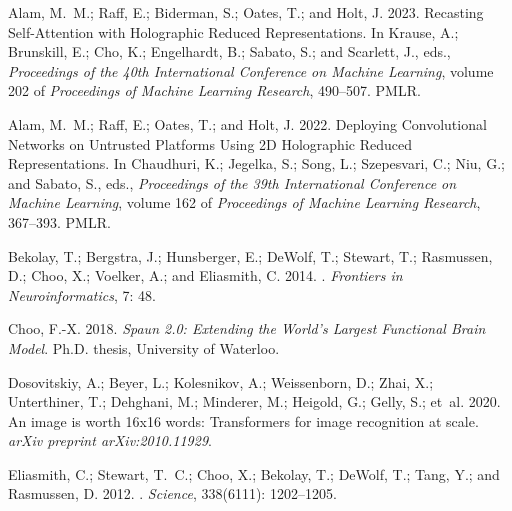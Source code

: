 \documentclass[letterpaper]{article} %
\begin{document}
\clearpage
\begin{thebibliography}{33}
    \providecommand{\natexlab}[1]{#1}

    Alam, M.~M.; Raff, E.; Biderman, S.; Oates, T.; and Holt, J. 2023.
    \newblock Recasting Self-Attention with Holographic Reduced Representations.
    \newblock In Krause, A.; Brunskill, E.; Cho, K.; Engelhardt, B.; Sabato, S.;
      and Scarlett, J., eds., \emph{Proceedings of the 40th International
      Conference on Machine Learning}, volume 202 of \emph{Proceedings of Machine
      Learning Research}, 490--507. PMLR.

    Alam, M.~M.; Raff, E.; Oates, T.; and Holt, J. 2022.
    \newblock Deploying Convolutional Networks on Untrusted Platforms Using 2{D}
      Holographic Reduced Representations.
    \newblock In Chaudhuri, K.; Jegelka, S.; Song, L.; Szepesvari, C.; Niu, G.; and
      Sabato, S., eds., \emph{Proceedings of the 39th International Conference on
      Machine Learning}, volume 162 of \emph{Proceedings of Machine Learning
      Research}, 367--393. PMLR.

    Bekolay, T.; Bergstra, J.; Hunsberger, E.; DeWolf, T.; Stewart, T.; Rasmussen,
      D.; Choo, X.; Voelker, A.; and Eliasmith, C. 2014.
    .
    \newblock \emph{Frontiers in Neuroinformatics}, 7: 48.

    Choo, F.-X. 2018.
    \newblock \emph{{Spaun 2.0: Extending the World's Largest Functional Brain
      Model}}.
    \newblock Ph.D. thesis, University of Waterloo.

    Dosovitskiy, A.; Beyer, L.; Kolesnikov, A.; Weissenborn, D.; Zhai, X.;
      Unterthiner, T.; Dehghani, M.; Minderer, M.; Heigold, G.; Gelly, S.; et~al.
      2020.
    \newblock An image is worth 16x16 words: Transformers for image recognition at
      scale.
    \newblock \emph{arXiv preprint arXiv:2010.11929}.

    Eliasmith, C.; Stewart, T.~C.; Choo, X.; Bekolay, T.; DeWolf, T.; Tang, Y.; and
      Rasmussen, D. 2012.
    .
    \newblock \emph{Science}, 338(6111): 1202--1205.


\end{thebibliography}
\end{document}
